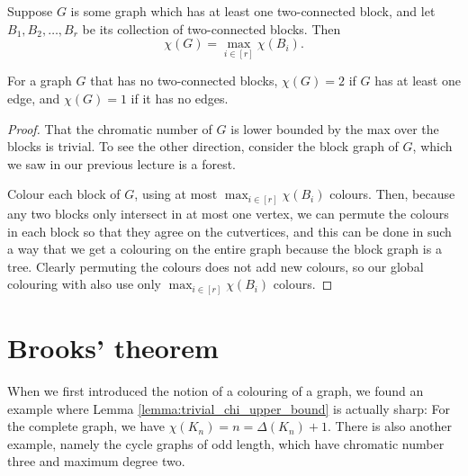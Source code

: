 \documentclass[nobib]{tufte-handout}
\begin{document}
\begin{lemma}\label{lemma:chi_max_over_biconnecteds}
  Suppose $G$ is some graph which has at least one two-connected block, and let $B_1, B_2, \ldots, B_r$ be its collection of two-connected blocks. Then
  $$\chi(G) = \max_{i\in[r]} \chi(B_i).$$

  For a graph $G$ that has no two-connected blocks, $\chi(G) = 2$ if $G$ has at least one edge, and $\chi(G) = 1$ if it has no edges.

  \begin{proof}
    That the chromatic number of $G$ is lower bounded by the max over the blocks is trivial. To see the other direction, consider the block graph of $G$, which we saw in our previous lecture is a forest.

    Colour each block of $G$, using at most $\max_{i\in[r]} \chi(B_i)$ colours. Then, because any two blocks only intersect in at most one vertex, we can permute the colours in each block so that they agree on the cutvertices, and this can be done in such a way that we get a colouring on the entire graph because the block graph is a tree. Clearly permuting the colours does not add new colours, so our global colouring with also use only $\max_{i\in[r]} \chi(B_i)$ colours.
  \end{proof}
\end{lemma}

\section{Brooks' theorem}

When we first introduced the notion of a colouring of a graph, we found an example where Lemma \ref{lemma:trivial_chi_upper_bound} is actually sharp: For the complete graph, we have $\chi(K_n) = n = \Delta(K_n) + 1$. There is also another example, namely the cycle graphs of odd length, which have chromatic number three and maximum degree two.
\end{document}

